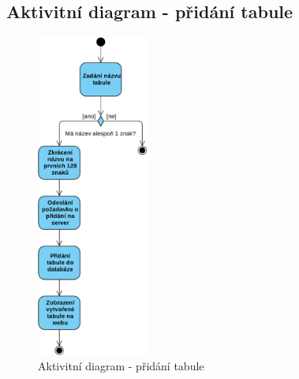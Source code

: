\subsection{Aktivitní diagram - přidání tabule}
\begin{figure}[h!]
	\centering
	\includegraphics[width=0.33\textwidth]{Figures/ActivityDiagram1.pdf}
	\caption{Aktivitní diagram - přidání tabule}
	\label{fig:ActivityDiagram1}
\end{figure}









